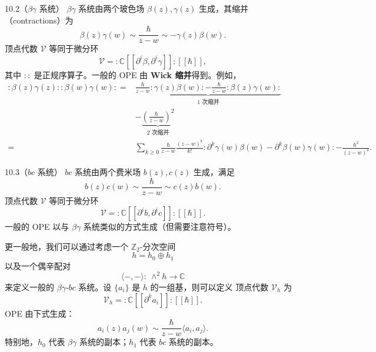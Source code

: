 \begin{wexam}{10.2}（$\beta\gamma$ 系统）
  $\beta\gamma$ 系统由两个玻色场 $\beta(z),\gamma(z)$ 生成，其缩并（contractions）为
  \[
    \beta(z)\gamma(w)\sim\frac{\hbar}{z-w}\sim-\gamma(z)\beta(w).
  \]
  顶点代数 $\mathcal{V}$ 等同于微分环
  \[
    \mathcal{V}=:\mathbb{C}[[\partial^i\beta,\partial^i\gamma]]:[[\hbar]],
  \]
  其中 $::$ 是正规序算子。一般的 OPE 由 \textbf{Wick 缩并}得到。例如，
  \[
    \begin{aligned}
      :\beta(z)\gamma(z)::\beta(w)\gamma(w):
      ={}&\underbrace{\frac{\hbar}{z-w}:\gamma(z)\beta(w):
      -\frac{\hbar}{z-w}:\beta(z)\gamma(w):}_{\text{1 次缩并}}\\
      &-\underbrace{\left(\frac{\hbar}{z-w}\right)^{2}}_{\text{2 次缩并}}\\
      ={}&\sum_{k\ge0}\frac{\hbar}{z-w}\frac{(z-w)^k}{k!}
      :\partial^k\gamma(w)\beta(w)-\partial^k\beta(w)\gamma(w):
      -\frac{\hbar^2}{(z-w)^2}.
    \end{aligned}
  \]
\end{wexam}


\begin{wexam}{10.3}（$bc$ 系统）
  $bc$ 系统由两个费米场 $b(z),c(z)$ 生成，满足
  \[
    b(z)c(w)\sim\frac{\hbar}{z-w}\sim c(z)b(w).
  \]
  顶点代数 $\mathcal{V}$ 等同于微分环
  \[
    \mathcal{V}=:\mathbb{C}[[\partial^ib,\partial^ic]]:[[\hbar]].
  \]
  一般的 OPE 以与 $\beta\gamma$ 系统类似的方式生成（但需要注意符号）。
\end{wexam}

更一般地，我们可以通过考虑一个 $\mathbb{Z}_2$-分次空间
\[
  h=h_0\oplus h_1
\]
以及一个偶辛配对
\[
  \langle-,-\rangle:\ \wedge^2h\longrightarrow\mathbb{C}
\]
来定义一般的 $\beta\gamma$-$bc$ 系统。设 $\{a_i\}$ 是 $h$ 的一组基，则可以定义
顶点代数 $\mathcal{V}_h$ 为
\[
  \mathcal{V}_h=:\mathbb{C}[[\partial^ka_i]]:[[\hbar]].
\]
OPE 由下式生成：
\[
  a_i(z)a_j(w)\sim\frac{\hbar}{z-w}\langle a_i,a_j\rangle.
\]
特别地，$h_0$ 代表 $\beta\gamma$ 系统的副本；$h_1$ 代表 $bc$ 系统的副本。


